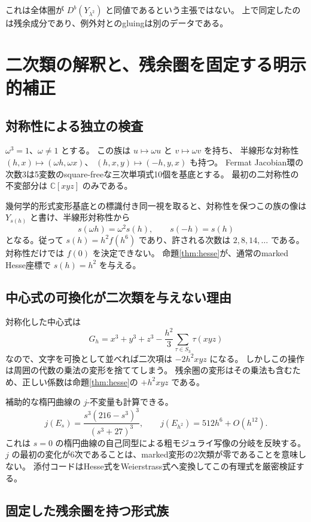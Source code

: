 \documentclass[a4paper,11pt]{ltjsarticle}
\theoremstyle{definition}
\newcommand{\CC}{\mathbb C}
\begin{document}
これは全体圏が $D^b(Y_{\lambda^2})$ と同値であるという主張ではない。
上で同定したのは残余成分であり、例外対とのgluingは別のデータである。

\section{二次類の解釈と、残余圏を固定する明示的補正}

\subsection{対称性による独立の検査}

$\omega^3=1$、$\omega\ne1$ とする。
この族は $u\mapsto\omega u$ と $v\mapsto\omega v$ を持ち、
半線形な対称性 $(h,x)\mapsto(\omega h,\omega x)$、
$(h,x,y)\mapsto(-h,y,x)$ も持つ。
Fermat Jacobian環の次数3は5変数のsquare-freeな三次単項式10個を基底とする。
最初の二対称性の不変部分は $\CC[xyz]$ のみである。

幾何学的形式変形基底との標識付き同一視を取ると、対称性を保つこの族の像は
$Y_{s(h)}$ と書け、半線形対称性から
\[
 s(\omega h)=\omega^2s(h),\qquad s(-h)=s(h)
\]
となる。従って $s(h)=h^2f(h^6)$ であり、許される次数は $2,8,14,\ldots$ である。
対称性だけでは $f(0)$ を決定できない。
命題\ref{thm:hesse}が、通常のmarked Hesse座標で $s(h)=h^2$ を与える。

\subsection{中心式の可換化が二次類を与えない理由}

対称化した中心式は
\[
 G_h=x^3+y^3+z^3-\frac{h^2}{3}\sum_{\tau\in S_3}\tau(xyz)
\]
なので、文字を可換として並べれば二次項は $-2h^2xyz$ になる。
しかしこの操作は周囲の代数の乗法の変形を捨ててしまう。
残余圏の変形はその乗法も含むため、正しい係数は命題\ref{thm:hesse}の
$+h^2xyz$ である。

補助的な楕円曲線の $j$-不変量も計算できる。
\[
 j(E_s)=\frac{s^3(216-s^3)^3}{(s^3+27)^3},\qquad
 j(E_{h^2})=512h^6+O(h^{12}).
\]
これは $s=0$ の楕円曲線の自己同型による粗モジュライ写像の分岐を反映する。
$j$ の最初の変化が6次であることは、marked変形の2次類が零であることを意味しない。
添付コードはHesse式をWeierstrass式へ変換してこの有理式を厳密検証する。

\subsection{固定した残余圏を持つ形式族}
\end{document}
